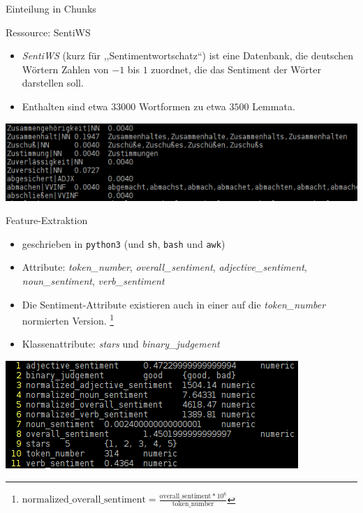 \documentclass[note=hide]{beamer} %
\newcommand{\proglang}[1]{\texttt{#1}}
\newcommand{\feature}[1]{\emph{#1}}
\newcommand{\checkthis}[1]{#1}
\begin{document}
\begin{frame}{Einteilung in Chunks}

\end{frame}

\begin{frame}{Ressource: SentiWS}
	\begin{itemize}
		\item \emph{SentiWS} (kurz für ,,Sentimentwortschatz``) ist eine Datenbank, die deutschen Wörtern Zahlen von $-1$ bis $1$ zuordnet, die das \checkthis{Sentiment} der Wörter darstellen soll.
		\item Enthalten sind etwa $33000$ Wortformen zu etwa $3500$ Lemmata.
	\end{itemize}
	\includegraphics[width=\textwidth]{sentiws_example_black.png}
\end{frame}

\begin{frame}{Feature-Extraktion}
	\begin{itemize}
		\item geschrieben in \proglang{python3} (und \proglang{sh}, \proglang{bash} und \proglang{awk})
		\item Attribute: \feature{token\_number}, \feature{overall\_sentiment}, \feature{adjective\_sentiment}, \feature{noun\_sentiment}, \feature{verb\_sentiment}
		\item Die Sentiment-Attribute existieren auch in einer auf die \feature{token\_number} normierten Version.
			\footnote{$\text{normalized\_overall\_sentiment} = \frac{\text{overall\_sentiment} * 10^6}{\text{token\_number}}$}
		\item Klassenattribute: \feature{stars} und \feature{binary\_judgement}
	\end{itemize}
	\includegraphics[width=\textwidth]{features_example_black.png}
\end{frame}
\end{document}
